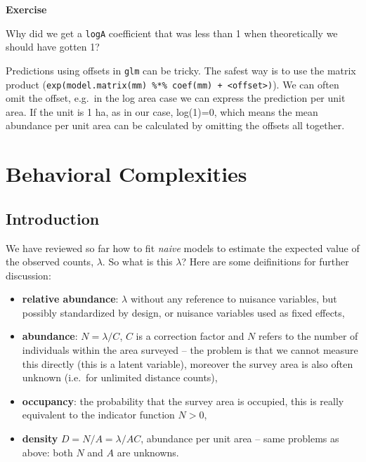 \documentclass[12pt,]{book}
\providecommand{\tightlist}{%
  \setlength{\itemsep}{0pt}\setlength{\parskip}{0pt}}
\let\BeginKnitrBlock\begin \let\EndKnitrBlock\end
\begin{document}
\BeginKnitrBlock{rmdexercise}
\textbf{Exercise}

Why did we get a \texttt{logA} coefficient that was less than 1 when theoretically we should have gotten 1?
\EndKnitrBlock{rmdexercise}

Predictions using offsets in \texttt{glm} can be tricky.
The safest way is to use the matrix product
(\texttt{exp(model.matrix(mm)\ \%*\%\ coef(mm)\ +\ \textless{}offset\textgreater{})}).
We can often omit the offset, e.g.~in the log area case
we can express the prediction per unit area.
If the unit is 1 ha, as in our case, log(1)=0, which means
the mean abundance per unit area can be calculated by
omitting the offsets all together.

\hypertarget{behavior}{%
\chapter{Behavioral Complexities}\label{behavior}}

\hypertarget{introduction-2}{%
\section{Introduction}\label{introduction-2}}

We have reviewed so far how to fit \emph{naive} models to estimate
the expected value of the observed counts, \(\lambda\).
So what is this \(\lambda\)?
Here are some deifinitions for further discussion:

\begin{itemize}
\tightlist
\item
  \textbf{relative abundance}: \(\lambda\) without any reference to nuisance variables, but possibly standardized by design, or nuisance variables used as fixed effects,
\item
  \textbf{abundance}: \(N=\lambda/C\), \(C\) is a correction factor and \(N\) refers to the number of individuals within the area surveyed -- the problem is that we cannot measure this directly (this is a latent variable), moreover the survey area is also often unknown (i.e.~for unlimited distance counts),
\item
  \textbf{occupancy}: the probability that the survey area is occupied, this is really equivalent to the indicator function \(N>0\),
\item
  \textbf{density} \(D = N/A = \lambda/AC\), abundance per unit area -- same problems as above: both \(N\) and \(A\) are unknowns.
\end{itemize}
\end{document}
